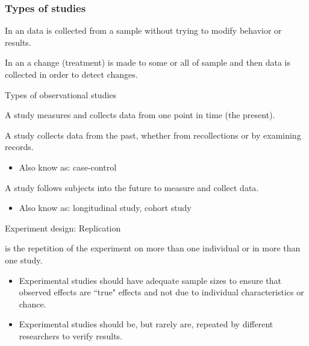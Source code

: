 \documentclass[xcolor=table, handout]{beamer}
\begin{document}
\begin{frame}
\frametitle{Types of studies}

\begin{block}{}
\large In an  data is collected from a sample without trying to modify behavior or results. 
\end{block}
\pause
\begin{block}{}
\large In an  a change (treatment) is made to some or all of sample and then data is collected in order to detect changes. 
\end{block}

\end{frame}

\begin{frame}{Types of observational studies}

\begin{block}{}
\large
A  study measures and collects data from one point in time (the present).
\end{block}
\pause
\begin{block}{}
\large
A  study collects data from the past, whether from recollections or by examining records.
\begin{itemize}
\item Also know as: case-control
\end{itemize}
\end{block}
\pause
\begin{block}{}
\large
A  study follows subjects into the future to measure and collect data.
\begin{itemize}
\item Also know as: longitudinal study, cohort study
\end{itemize}
\end{block}
\end{frame}

\begin{frame}{Experiment design: Replication}
\begin{block}{}
\large
{} is the repetition of the experiment on more than one individual or in more than one study.

\begin{itemize}
\pause\item Experimental studies should have adequate sample sizes to ensure that observed effects are ``true" effects and not due to individual characteristics or chance.
\pause\item Experimental studies should be, but rarely are, repeated by different researchers to verify results.
\end{itemize}
\end{block}
\end{frame}
\end{document}

